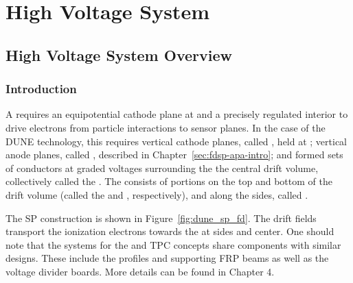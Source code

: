 \chapter{High Voltage System}
\label{ch:fdsp-hv}

\section{High Voltage System Overview}
\label{sec:fdsp-hv-ov}


\subsection{Introduction}
\label{sec:fdsp-hv-intro}

A  requires an equipotential cathode plane at  and a precisely regulated interior \efield{} to drive 
electrons from particle interactions to sensor planes.  In the case of the DUNE  technology, 
this requires vertical cathode planes, called , held at ; vertical anode planes, called , described in Chapter~\ref{sec:fdsp-apa-intro}; and formed sets of conductors at graded voltages surrounding the
 the central drift volume, collectively called the . The  consists of portions on the top and bottom  
of the drift volume (called the  and , respectively), and along the sides, called .


The SP  construction is shown in Figure~\ref{fig:dune_sp_fd}.
The  drift fields transport the ionization electrons 
towards the  at sides and center.
One should note that the  systems for the \single and \dual TPC concepts share components with similar designs. These include the  profiles and supporting FRP beams as well as the voltage divider boards. More details can be found in \voltitledpfd Chapter 4.


